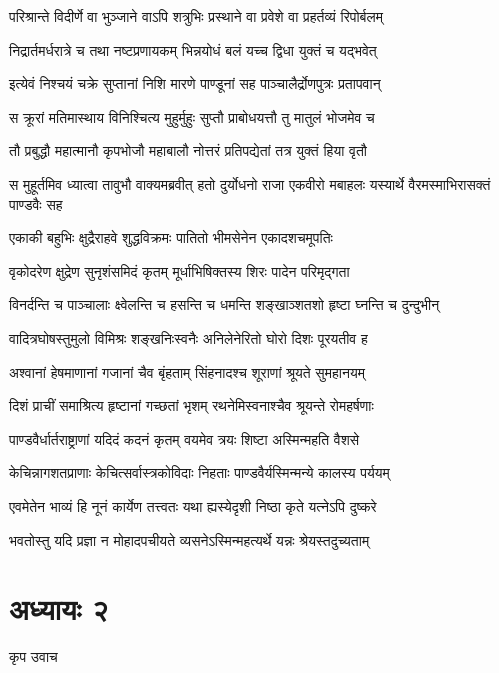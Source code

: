 \twolineshloka
{परिश्रान्ते विदीर्णे वा भुञ्जाने वाऽपि शत्रुभिः}
{प्रस्थाने वा प्रवेशे वा प्रहर्तव्यं रिपोर्बलम्}


\twolineshloka
{निद्रार्तमर्धरात्रे च तथा नष्टप्रणायकम्}
{भिन्नयोधं बलं यच्च द्विधा युक्तं च यद्भवेत्}


\twolineshloka
{इत्येवं निश्चयं चक्रे सुप्तानां निशि मारणे}
{पाण्डूनां सह पाञ्चालैर्द्रोणपुत्रः प्रतापवान्}


\twolineshloka
{स क्रूरां मतिमास्थाय विनिश्चित्य मुहुर्मुहुः}
{सुप्तौ प्राबोधयत्तौ तु मातुलं भोजमेव च}


\twolineshloka
{तौ प्रबुद्धौ महात्मानौ कृपभोजौ महाबालौ}
{नोत्तरं प्रतिपद्येतां तत्र युक्तं हिया वृतौ}


स मुहूर्तमिव ध्यात्वा तावुभौ वाक्यमब्रवीत्
\twolineshloka
{हतो दुर्योधनो राजा एकवीरो मबाहलः}
{यस्यार्थे वैरमस्माभिरासक्तं पाण्डवैः सह}


\twolineshloka
{एकाकी बहुभिः क्षुद्रैराहवे शुद्धविक्रमः}
{पातितो भीमसेनेन एकादशचमूपतिः}


\twolineshloka
{वृकोदरेण क्षुद्रेण सुनृशंसमिदं कृतम्}
{मूर्धाभिषिक्तस्य शिरः पादेन परिमृद्गता}


\twolineshloka
{विनर्दन्ति च पाञ्चालाः क्ष्वेलन्ति च हसन्ति च}
{धमन्ति शङ्खाञ्शतशो हृष्टा घ्नन्ति च दुन्दुभीन्}


\twolineshloka
{वादित्रघोषस्तुमुलो विमिश्रः शङ्खनिःस्वनैः}
{अनिलेनेरितो घोरो दिशः पूरयतीव ह}


\twolineshloka
{अश्वानां हेषमाणानां गजानां चैव बृंहताम्}
{सिंहनादश्च शूराणां श्रूयते सुमहानयम्}


\twolineshloka
{दिशं प्राचीं समाश्रित्य हृष्टानां गच्छतां भृशम्}
{रथनेमिस्वनाश्चैव श्रूयन्ते रोमहर्षणाः}


\twolineshloka
{पाण्डवैर्धार्तराष्ट्राणां यदिदं कदनं कृतम्}
{वयमेव त्रयः शिष्टा अस्मिन्महति वैशसे}


\twolineshloka
{केचिन्नागशतप्राणाः केचित्सर्वास्त्रकोविदाः}
{निहताः पाण्डवैर्यस्मिन्मन्ये कालस्य पर्ययम्}


\twolineshloka
{एवमेतेन भाव्यं हि नूनं कार्येण तत्त्वतः}
{यथा ह्यस्येदृशी निष्ठा कृते यत्नेऽपि दुष्करे}


\twolineshloka
{भवतोस्तु यदि प्रज्ञा न मोहादपचीयते}
{व्यसनेऽस्मिन्महत्यर्थे यन्नः श्रेयस्तदुच्यताम्}


\chapter{अध्यायः २}
\twolineshloka
{कृप उवाच}
{}


